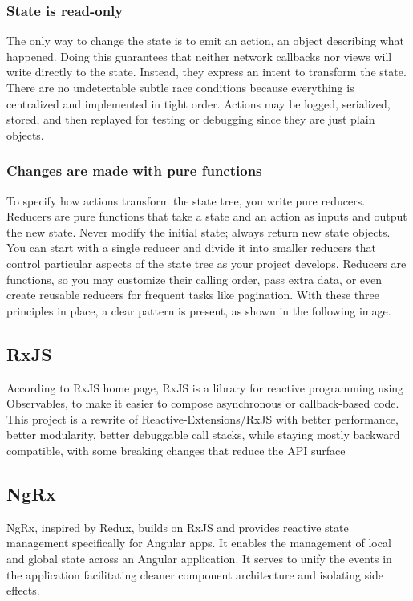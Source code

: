 \subsubsection{State is read-only}
The only way to change the state is to emit an action, an object describing what happened.
Doing this guarantees that neither network callbacks nor views will write directly to the state. Instead, they express an intent to transform the state. There are no undetectable subtle race conditions because everything is centralized and implemented in tight order. Actions may be logged, serialized, stored, and then replayed for testing or debugging since they are just plain objects.
\subsubsection{Changes are made with pure functions}
To specify how actions transform the state tree, you write pure reducers.
Reducers are pure functions that take a state and an action as inputs and output the new state. Never modify the initial state; always return new state objects. You can start with a single reducer and divide it into smaller reducers that control particular aspects of the state tree as your project develops. Reducers are functions, so you may customize their calling order, pass extra data, or even create reusable reducers for frequent tasks like pagination.
With these three principles in place, a clear pattern is present, as shown in the following image.
\subsection{RxJS}
According to RxJS home page, RxJS is a library for reactive programming using Observables, to make it easier to compose asynchronous or callback-based code. This project is a rewrite of Reactive-Extensions/RxJS with better performance, better modularity, better debuggable call stacks, while staying mostly backward compatible, with some breaking changes that reduce the API surface
\subsection{NgRx}
NgRx, inspired by Redux, builds on RxJS and provides reactive state management specifically for Angular apps. It enables the management of local and global state across an Angular application. It serves to unify the events in the application facilitating cleaner component architecture and isolating side effects. 
